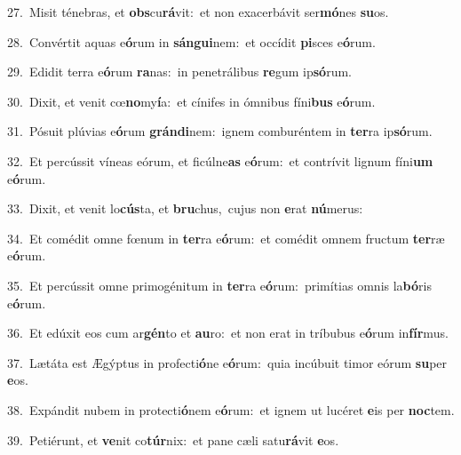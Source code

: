 {\numbfont\textcolor{\numbcolor}{27.}}~Misit ténebras, et \textbf{obs}\-cu\-\textbf{rá}\-vit:~\star et non exacerbávit ser\-\textbf{mó}\-nes \textbf{su}\-os.\par
{\numbfont\textcolor{\numbcolor}{28.}}~Convértit aquas e\-\textbf{ó}\-rum in \textbf{sán}\-\textbf{gui}nem:~\star et occídit \textbf{pi}\-sces e\-\textbf{ó}\-rum.\par
{\numbfont\textcolor{\numbcolor}{29.}}~Edidit terra e\-\textbf{ó}\-rum \textbf{ra}\-nas:~\star in penetrálibus \textbf{re}\-gum ip\-\textbf{só}\-rum.\par
{\numbfont\textcolor{\numbcolor}{30.}}~Dixit, et venit cœ\-\textbf{no}\-my\-\textbf{í}\-a:~\star et cínifes in ómnibus fíni\textbf{bus} e\-\textbf{ó}\-rum.\par
{\numbfont\textcolor{\numbcolor}{31.}}~Pósuit plúvias e\-\textbf{ó}\-rum \textbf{grán}\-\textbf{di}nem:~\star ignem comburéntem in \textbf{ter}\-ra ip\-\textbf{só}\-rum.\par
{\numbfont\textcolor{\numbcolor}{32.}}~Et percússit víneas eórum, et ficúlne\textbf{as} e\-\textbf{ó}\-rum:~\star et contrívit lignum fíni\textbf{um} e\-\textbf{ó}\-rum.\par
{\numbfont\textcolor{\numbcolor}{33.}}~Dixit, et venit lo\-\textbf{cús}\-ta, et \textbf{bru}\-chus,~\star cujus non \textbf{e}\-rat \textbf{nú}\-merus:\par
{\numbfont\textcolor{\numbcolor}{34.}}~Et comédit omne fœnum in \textbf{ter}\-ra e\-\textbf{ó}\-rum:~\star et comédit omnem fructum \textbf{ter}\-ræ e\-\textbf{ó}\-rum.\par
{\numbfont\textcolor{\numbcolor}{35.}}~Et percússit omne primogénitum in \textbf{ter}\-ra e\-\textbf{ó}\-rum:~\star primítias omnis la\-\textbf{bó}\-ris e\-\textbf{ó}\-rum.\par
{\numbfont\textcolor{\numbcolor}{36.}}~Et edúxit eos cum ar\-\textbf{gén}\-to et \textbf{au}\-ro:~\star et non erat in tríbubus e\-\textbf{ó}\-rum in\-\textbf{fír}\-mus.\par
{\numbfont\textcolor{\numbcolor}{37.}}~Lætáta est Ægýptus in profecti\-\textbf{ó}\-ne e\-\textbf{ó}\-rum:~\star quia incúbuit timor eórum \textbf{su}\-per \textbf{e}\-os.\par
{\numbfont\textcolor{\numbcolor}{38.}}~Expándit nubem in protecti\-\textbf{ó}\-nem e\-\textbf{ó}\-rum:~\star et ignem ut lucéret \textbf{e}\-is per \textbf{noc}\-tem.\par
{\numbfont\textcolor{\numbcolor}{39.}}~Petiérunt, et \textbf{ve}\-nit co\-\textbf{túr}\-nix:~\star et pane cæli satu\-\textbf{rá}\-vit \textbf{e}\-os.\par
